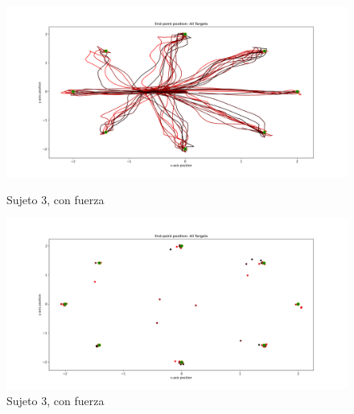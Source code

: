 \documentclass[a4paper,11pt, oneside]{book}
\begin{document}
\begin{figure}[H]
	\begin{minipage}[b]{0.5\linewidth}
		\centering
		\includegraphics[width=\linewidth]{sujeto3/force/trayectorias}
		\caption{Sujeto 3, con fuerza}
		\label{3-fase2-1}
	\end{minipage}
	\hspace{0.5cm}
	\begin{minipage}[b]{0.5\linewidth}
		\centering
		\includegraphics[width=\linewidth]{sujeto3/force/trayectorias_puntos}
		\caption{Sujeto 3, con fuerza}
		\label{3-fase2-2}
	\end{minipage}
\end{figure}
\end{document}
